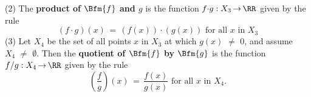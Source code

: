 \V

        (2) The {\bf product of $\Bfm{f}$ and $g$} is the function $f{\cdot}g:X_{3} \,{\rightarrow}\, {\RR}$ given by the rule
        \begin{displaymath}
        (f{\cdot}g)(x) \,=\, (f(x)){\cdot}(g(x)) \mbox{ for all $x$ in $X_{3}$}
        \end{displaymath}
\V
        (3) Let $X_{4}$ be the set of all points $x$ in $X_{3}$ at which $g(x) \,\,{\neq}\,\, 0$, and assume $X_{4} \,\,{\neq}\,\, {\emptyset}$.
    Then the {\bf quotient of $\Bfm{f}$ by $\Bfm{g}$} is the function $f/g:X_{4} \,{\rightarrow}\, {\RR}$ given by the rule
        \begin{displaymath}
        \left(\frac{f}{g}\right)(x) \,=\, \frac{f(x)}{g(x)} \mbox{ for all $x$ in $X_{4}$}.
        \end{displaymath}



